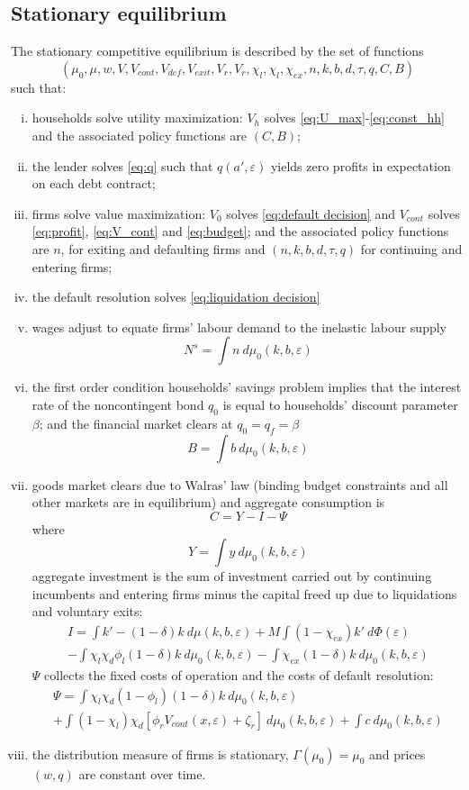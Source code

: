 \documentclass[12pt]{article}
\begin{document}
\subsection{Stationary equilibrium}\label{sec:eq}
The stationary competitive equilibrium is described by the set of functions
$$(\mu_0, \mu, w, V, V_{cont}, V_{def},  V_{exit}, V_r, V_r, \chi_l, \chi_l, \chi_{ex}, n,k,b,d,\tau,q, C, B)$$
such that: 
\begin{enumerate}[(i)]
\item households solve utility maximization: $V_h$ solves \ref{eq:U_max}-\ref{eq:const_hh} and the associated policy functions are $(C, B)$;
\item the lender solves \ref{eq:q} such that $q(a',\varepsilon)$ yields zero profits in expectation on each debt contract;
\item firms solve value maximization: $V_0$ solves \ref{eq:default decision} and $V_{cont}$ solves \ref{eq:profit}, \ref{eq:V_cont} and \ref{eq:budget}; and the associated policy functions are $n$, for exiting and defaulting firms and $(n,k,b,d,\tau,q)$ for continuing and entering firms;
\item the default resolution solves \ref{eq:liquidation decision} 
\item wages adjust to equate firms' labour demand to the inelastic labour supply
$$ N^s = \int n  \ d \mu_0 (k,b,\varepsilon)  $$
\item the first order condition households' savings problem implies that the interest rate of the noncontingent bond $q_0$ is equal to households' discount parameter $\beta$; and the financial market clears at $q_0 = q_f = \beta$
 $$ B = \int b \ d \mu_0 (k,b,\varepsilon) $$
\item goods market clears due to Walras' law (binding budget constraints and all other markets are in equilibrium) and aggregate consumption is
 $$ C = Y - I - \Psi$$
where
 $$ Y =  \int y \ d \mu_0 (k,b,\varepsilon) $$
aggregate investment is the sum of investment carried out by continuing incumbents and entering firms minus the capital freed up due to liquidations and voluntary exits:
\begin{multline*} 
    I = \int   k' -(1-\delta)k \ d \mu (k,b,\varepsilon) + M \int (1-\chi_{ex}) k' \ d \Phi(\varepsilon)    \\
   -  \int   \chi_l \chi_d \phi_l (1-\delta)k \ d \mu_0 (k,b,\varepsilon) - \int \chi_{ex} (1-\delta) k \ d \mu_0 (k,b,\varepsilon)   
\end{multline*}
$\Psi$ collects the fixed costs of operation and the costs of default resolution:
\begin{multline*} 
    \Psi = \int  \chi_l \chi_d (1-\phi_l) (1-\delta)k \ d \mu_0 (k,b,\varepsilon)  \\ + \int  (1 - \chi_l)  \chi_d [\phi_r V_{cont}(x, \varepsilon) + \zeta_r] \ d \mu_0 (k,b,\varepsilon) + \int  c \ d \mu_0 (k,b,\varepsilon) 
\end{multline*}
\item the distribution measure of firms is stationary, $\Gamma(\mu_0) = \mu_0$ and prices $(w,q)$ are constant over time.
\end{enumerate}
\end{document}
